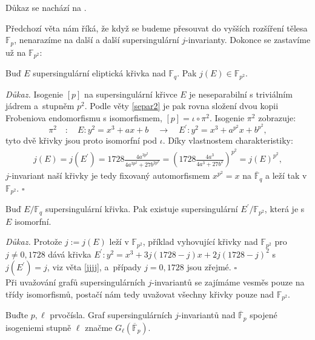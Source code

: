 \documentclass[12pt]{report}
\begin{document}
Důkaz se nachází na \cite[Cor. 4.40]{Washington}.

Předchozí věta nám říká, že když se budeme přesouvat do vyšších rozšíření tělesa $\mathbb{F}_p$, nenarazíme na další a další supersingulární $j$-invarianty. Dokonce se zastavíme už na $\mathbb{F}_{p^2}$:

\begin{veta}
Buď $E$ supersingulární eliptická křivka nad $\mathbb{F}_q$. Pak $j(E) \in \mathbb{F}_{p^2}$.
\end{veta}
\noindent \textit{Důkaz.} Isogenie $[p]$ na supersingulární křivce $E$ je neseparabilní s triviálním jádrem a~stupněm $p^2$. Podle věty \ref{separ2} je pak rovna složení dvou kopii Frobeniova endomorfismu s isomorfismem, $[p] = \iota \circ \pi ^2$. Isogenie $\pi^2$ zobrazuje:
\begin{equation*}
\pi^2 \quad : \quad E: y^2 = x^3+ax+b  \quad \longrightarrow \quad E^\prime : y^2 = x^3 + a^{p^2}x + b^{p^2},
\end{equation*}
tyto dvě křivky jsou proto isomorfní pod $\iota$. Díky vlastnostem charakteristiky:
\begin{align*}
 j(E) = j(E^\prime) = 1728 \frac{4 a^{3 p^2}}{4 a^{3 p^2} + 27 b^{2 p^2}} = \left( 1728 \frac{4 a^3}{4a^3+27b^2} \right)^{p^2} = j(E)^{p^2},
\end{align*}
$j$-invariant naší křivky je tedy fixovaný automorfismem $x^{p^2} = x$ na $\overline{\mathbb{F}}_q$ a leží tak v $\mathbb{F}_{p^2}$. \hfill $\square$\\

\begin{dusledek}\label{Fp2}
Buď $E/\mathbb{F}_q$ supersingulární křivka. Pak existuje supersingulární $E^\prime/\mathbb{F}_{p^2}$, která je s $E$ isomorfní.
\end{dusledek}
\noindent \textit{Důkaz.} Protože $j := j(E)$ leží v $\mathbb{F}_{p^2}$, příklad vyhovující křivky nad $\mathbb{F}_{p^2}$ pro $j \neq 0,1728$ dává křivka $E^\prime : y^2 = x^3 +3j(1728-j)x + 2j(1728-j)^2$ s $j(E^\prime) = j$, viz věta \ref{jjjj}, a~případy $j = 0,1728$ jsou zřejmé. \hfill $\square$\\

Při uvažování grafů supersingulárních $j$-invariantů se zajímáme vesměs pouze na třídy isomorfismů, postačí nám tedy uvažovat všechny křivky pouze nad $\mathbb{F}_{p^2}$.

\begin{znaceni}
Buďte $p, \ell$ prvočísla. Graf supersingulárních $j$-invariantů nad $\overline{\mathbb{F}}_p$ spojené isogeniemi stupně $\ell$ značme $G_{\ell} (\overline{\mathbb{F}}_p)$.
\end{znaceni}
\end{document}
